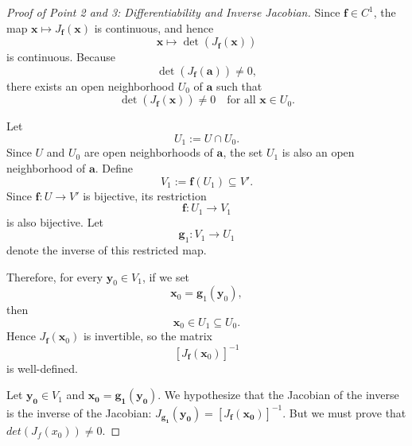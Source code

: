 \documentclass{article}
\begin{document}
\begin{proof}[Proof of Point 2 and 3: Differentiability and Inverse Jacobian]
Since $\mathbf f\in C^1$, the map $\mathbf x\mapsto J_{\mathbf f}(\mathbf x)$ is continuous, and hence
\[
\mathbf x\mapsto \det(J_{\mathbf f}(\mathbf x))
\]
is continuous. Because
\[
\det(J_{\mathbf f}(\mathbf a))\neq 0,
\]
there exists an open neighborhood $U_0$ of $\mathbf a$ such that
\[
\det(J_{\mathbf f}(\mathbf x))\neq 0
\quad \text{for all } \mathbf x\in U_0.
\]

Let
\[
U_1:=U\cap U_0.
\]
Since $U$ and $U_0$ are open neighborhoods of $\mathbf a$, the set $U_1$ is also an open neighborhood of $\mathbf a$. Define
\[
V_1:=\mathbf f(U_1)\subseteq V'.
\]
Since $\mathbf f:U\to V'$ is bijective, its restriction
\[
\mathbf f:U_1\to V_1
\]
is also bijective. Let
\[
\mathbf g_1:V_1\to U_1
\]
denote the inverse of this restricted map.

Therefore, for every $\mathbf y_0\in V_1$, if we set
\[
\mathbf x_0=\mathbf g_1(\mathbf y_0),
\]
then
\[
\mathbf x_0\in U_1\subseteq U_0.
\]
Hence $J_{\mathbf f}(\mathbf x_0)$ is invertible, so the matrix
\[
[J_{\mathbf f}(\mathbf x_0)]^{-1}
\]
is well-defined.


Let $\mathbf{y_0} \in V_1$ and $\mathbf{x_0} = \mathbf{g_1}(\mathbf{y_0})$. We hypothesize that the Jacobian of the inverse is the inverse of the Jacobian: $J_{\mathbf{g_1}}(\mathbf{y_0}) = [J_{\mathbf{f}}(\mathbf{x_0})]^{-1}$. But we must prove that $det(J_f(x_0)) \ne 0$.



\end{proof}
\end{document}

